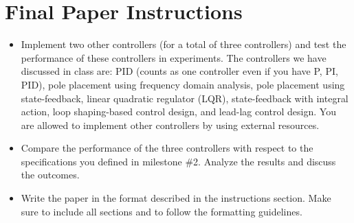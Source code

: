 \documentclass{ee122_notes}
\begin{document}
\section{Final Paper Instructions}
\begin{itemize}
\item[Task 1] Implement two other controllers (for a total of three controllers) and test the performance of these controllers in experiments. The controllers we have discussed in class are: PID (counts as one controller even if you have P, PI, PID), pole placement using frequency domain analysis, pole placement using state-feedback, linear quadratic regulator (LQR), state-feedback with integral action, loop shaping-based control design, and lead-lag control design. You are allowed to implement other controllers by using external resources.
\item[Task 2] Compare the performance of the three controllers with respect to the specifications you defined in milestone \#2. Analyze the results and discuss the outcomes.
\item[Task 3] Write the paper in the format described in the instructions section. Make sure to include all sections and to follow the formatting guidelines.
\end{itemize}
\end{document}
